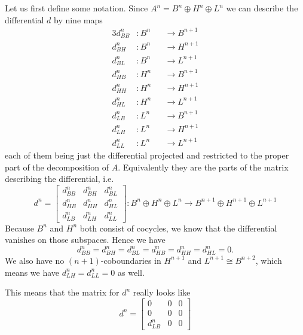 Let us first define some notation. Since $A^n=B^n\oplus H^n\oplus L^n$ we can describe the differential $d$ by nine maps 
\begin{alignat*}{3}
    d^n_{BB}&\colon B^n &&\longrightarrow B^{n+1} \\
    d^n_{BH}&\colon B^n &&\longrightarrow H^{n+1} \\
    d^n_{BL}&\colon B^n &&\longrightarrow L^{n+1} \\
    d^n_{HB}&\colon H^n &&\longrightarrow B^{n+1} \\
    d^n_{HH}&\colon H^n &&\longrightarrow H^{n+1} \\
    d^n_{HL}&\colon H^n &&\longrightarrow L^{n+1} \\
    d^n_{LB}&\colon L^n &&\longrightarrow B^{n+1} \\
    d^n_{LH}&\colon L^n &&\longrightarrow H^{n+1} \\
    d^n_{LL}&\colon L^n &&\longrightarrow L^{n+1} 
\end{alignat*}
each of them being just the differential projected and restricted to the proper part of the decomposition of $A$. Equivalently they are the parts of the matrix describing the differential, i.e. 
\begin{equation*}
d^n = 
\begin{bmatrix}
    d^n_{BB} & d^n_{BH} & d^n_{BL} \\
    d^n_{HB} & d^n_{HH} & d^n_{HL} \\
    d^n_{LB} & d^n_{LH} & d^n_{LL} 
\end{bmatrix}
\colon B^n\oplus H^n\oplus L^n \longrightarrow B^{n+1}\oplus H^{n+1}\oplus L^{n+1}
\end{equation*}
Because $B^n$ and $H^n$ both consist of cocycles, we know that the differential vanishes on those subspaces. Hence we have 
\begin{equation*}
    d^n_{BB} = d^n_{BH} = d^n_{BL} = d^n_{HB} = d^n_{HH} = d^n_{HL} = 0.
\end{equation*}
We also have no $(n+1)$-coboundaries in $H^{n+1}$ and $L^{n+1}\cong B^{n+2}$, which means we have $d^n_{LH} = d^n_{LL} = 0$ as well.

This means that the matrix for $d^n$ really looks like
\begin{equation*}
d^n = 
\begin{bmatrix}
    0 & 0 & 0 \\
    0 & 0 & 0 \\
    d^n_{LB} & 0 & 0 
\end{bmatrix}    
\end{equation*}

